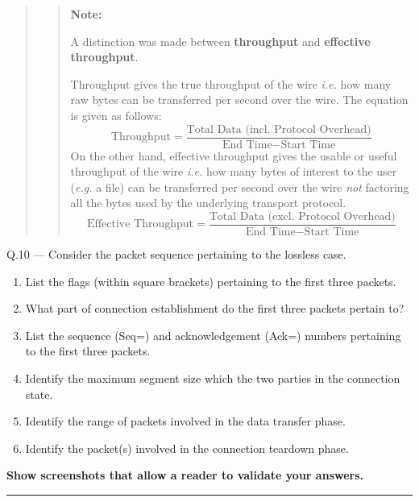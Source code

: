 \documentclass{article}
\newcommand\Que[2]{%
\begin{samepage}
\leavevmode\par
\noindent
Q.#1 --- #2\par\vspace{10pt}\hrule\vspace{10pt}
\end{samepage}}
\newenvironment{ans}
{\fbox{Answer}\begin{quote}\nopagebreak}
{\end{quote}}
\newcommand\ie{\emph{i.e.}}
\newcommand\eg{\emph{e.g.}}
\newenvironment{note}{%
\begin{quote}
\begin{tcolorbox}[colback=gray!10,arc=0mm,boxrule=0pt]
\raggedright
\textbf{Note:}%
}{%
\end{tcolorbox}
\end{quote}%
}
\begin{document}
\begin{ans}
\begin{note}
A distinction was made between \textbf{throughput} and \textbf{effective
throughput}.

Throughput gives the true throughput of the wire \ie{} how many
raw bytes can be transferred per second over the wire. The
equation is given as follows: $$ \text{Throughput} =
\frac{\text{Total Data (incl. Protocol Overhead)}}{\text{End
Time} - \text{Start Time}} $$ On the other hand, effective
throughput gives the usable or useful throughput of the wire
\ie{} how many bytes of interest to the user (\eg{} a file) can
be transferred per second over the wire \textit{not} factoring
all the bytes used by the underlying transport protocol. $$
\text{Effective Throughput} = \frac{\text{Total Data (excl.
Protocol Overhead)}}{\text{End Time} - \text{Start Time}} $$
\end{note}
\end{ans}

\Que{10}{
Consider the packet sequence pertaining to the lossless case.
\begin{enumerate}
\item List the flags (within square brackets) pertaining to the
      first three packets.
\item What part of connection establishment do the first three
      packets pertain to?
\item List the sequence (Seq=) and acknowledgement (Ack=) numbers
      pertaining to the first three packets.
\item Identify the maximum segment size which the two parties in
      the connection state.
\item Identify the range of packets involved in the data transfer
      phase.
\item Identify the packet(s) involved in the connection teardown
      phase.
\end{enumerate}

\textbf{Show screenshots that allow a reader to validate your answers.}}
\end{document}
